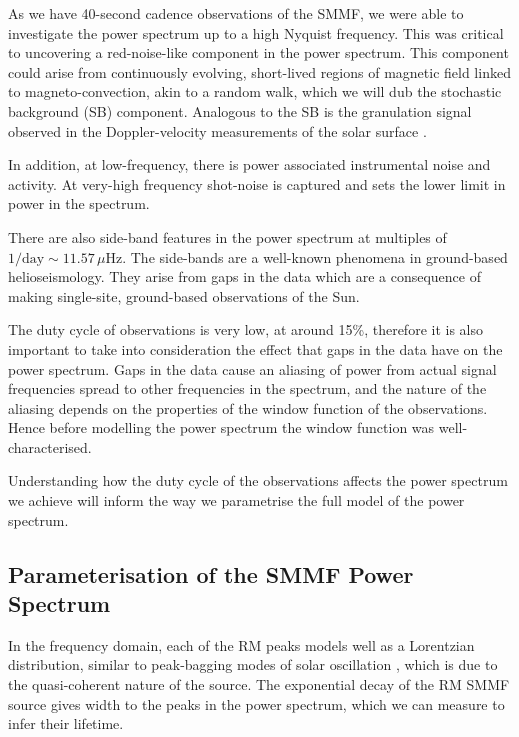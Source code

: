 As we have 40-second cadence observations of the SMMF, we were able to investigate the power spectrum up to a high Nyquist frequency. This was critical to uncovering a red-noise-like component in the power spectrum. This component could arise from continuously evolving, short-lived regions of magnetic field linked to magneto-convection, akin to a random walk, which we will dub the stochastic background (SB) component. Analogous to the SB is the granulation signal observed in the Doppler-velocity measurements of the solar surface \citep{basu_asteroseismic_2017}. 

In addition, at low-frequency, there is power associated instrumental noise and activity. At very-high frequency shot-noise is captured and sets the lower limit in power in the spectrum. 

There are also side-band features in the power spectrum at multiples of $1/\mathrm{day} \sim 11.57 \, \mu\mathrm{Hz}$. The side-bands are a well-known phenomena in ground-based helioseismology. They arise from gaps in the data which are a consequence of making single-site, ground-based observations of the Sun.

The duty cycle of observations is very low, at around 15\%, therefore it is also important to take into consideration the effect that gaps in the data have on the power spectrum. Gaps in the data cause an aliasing of power from actual signal frequencies spread to other frequencies in the spectrum, and the nature of the aliasing depends on the properties of the window function of the observations. Hence before modelling the power spectrum the window function was well-characterised.

Understanding how the duty cycle of the observations affects the power spectrum we achieve will inform the way we parametrise the full model of the power spectrum.


\subsection{Parameterisation of the SMMF Power Spectrum}

In the frequency domain, each of the RM peaks models well as a Lorentzian distribution, similar to peak-bagging modes of solar oscillation \citep{handberg_bayesian_2011, davies_low-frequency_2014}, which is due to the quasi-coherent nature of the source. The exponential decay of the RM SMMF source gives width to the peaks in the power spectrum, which we can measure to infer their lifetime.

